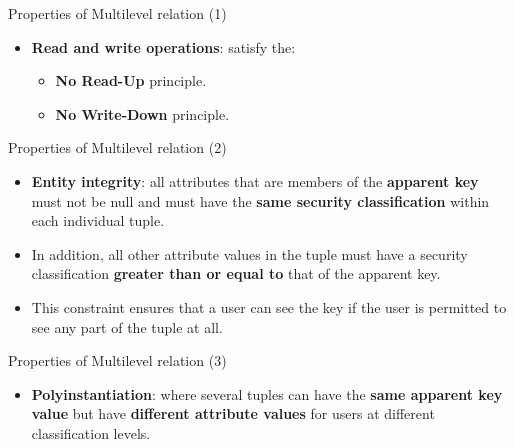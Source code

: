 \begin{frame}{Properties of Multilevel relation (1)}
    \Large
    \begin{itemize}
        \vspace{-1.5cm}
        \item \textbf{Read and write operations}: satisfy the:
        
        \vspace{0.5cm}
        \begin{itemize}
            \large
            \setlength{\itemsep}{0.3cm}
            \item \textbf{No Read-Up} principle.
            \item \textbf{No Write-Down} principle.
        \end{itemize}
        
    \end{itemize}
\end{frame}

\begin{frame}{Properties of Multilevel relation (2)}
    \Large
    \begin{itemize}
        \vspace{-1cm}
        \item \textbf{Entity integrity}: all attributes that are members of the \textbf{apparent key} must not be null and must have the \textbf{same security classification} within each individual tuple.
        
        \vspace{0.3cm}
        \item In addition, all other attribute values in the tuple must have a security classification \textbf{greater than or equal to} that of the apparent key.
        
        \vspace{0.3cm}
        \item This constraint ensures that a user can see the key if the user is permitted to see any part of the tuple at all.
    \end{itemize}
\end{frame}

\begin{frame}{Properties of Multilevel relation (3)}
    \Large
    \begin{itemize}
        \vspace{-1.5cm}
        \item \textbf{Polyinstantiation}: where several tuples can have the \textbf{same apparent key value} but have \textbf{different attribute values} for users at different classification levels.
    \end{itemize}
\end{frame}

